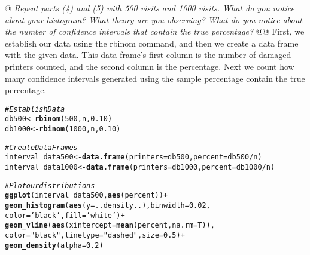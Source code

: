 \documentclass[10pt]{report}\usepackage[]{graphicx}\usepackage[]{xcolor}
\makeatletter
\newcommand{\hlnum}[1]{\textcolor[rgb]{0.686,0.059,0.569}{#1}}%
\newcommand{\hlstr}[1]{\textcolor[rgb]{0.192,0.494,0.8}{#1}}%
\newcommand{\hlcom}[1]{\textcolor[rgb]{0.678,0.584,0.686}{\textit{#1}}}%
\newcommand{\hlopt}[1]{\textcolor[rgb]{0,0,0}{#1}}%
\newcommand{\hlstd}[1]{\textcolor[rgb]{0.345,0.345,0.345}{#1}}%
\newcommand{\hlkwb}[1]{\textcolor[rgb]{0.69,0.353,0.396}{#1}}%
\newcommand{\hlkwc}[1]{\textcolor[rgb]{0.333,0.667,0.333}{#1}}%
\newcommand{\hlkwd}[1]{\textcolor[rgb]{0.737,0.353,0.396}{\textbf{#1}}}%
\newenvironment{kframe}{%
 \def\at@end@of@kframe{}%
 \ifinner\ifhmode%
  \def\at@end@of@kframe{\end{minipage}}%
  \begin{minipage}{\columnwidth}%
 \fi\fi%
 \def\FrameCommand##1{\hskip\@totalleftmargin \hskip-\fboxsep
 \colorbox{shadecolor}{##1}\hskip-\fboxsep
     \hskip-\linewidth \hskip-\@totalleftmargin \hskip\columnwidth}%
 \MakeFramed {\advance\hsize-\width
   \@totalleftmargin\z@ \linewidth\hsize
   \@setminipage}}%
 {\par\unskip\endMakeFramed%
 \at@end@of@kframe}
\newenvironment{knitrout}{}{} %
\makeatother
\begin{document}
\begin{easylist}[enumerate]
        \newpage
        @ \textit{Repeat parts (4) and (5) with 500 visits and 1000 visits. What do you notice about your histogram?
        What theory are you observing? What do you notice about the number of confidence intervals that contain the true
        percentage?}
        @@ First, we establish our data using the {\ttfamily rbinom} command, and then we create a data frame with the
        given data. This data frame's first column is the number of damaged printers counted, and the second column is
        the percentage. Next we count how many confidence intervals generated using the sample percentage contain the
        true percentage.

\begin{knitrout}
\color{fgcolor}\begin{kframe}
\begin{alltt}
         \hlcom{# Establish Data}
         \hlstd{db500} \hlkwb{<-} \hlkwd{rbinom}\hlstd{(}\hlnum{500}\hlstd{, n,} \hlnum{0.10}\hlstd{)}
         \hlstd{db1000} \hlkwb{<-} \hlkwd{rbinom}\hlstd{(}\hlnum{1000}\hlstd{, n,} \hlnum{0.10}\hlstd{)}

         \hlcom{# Create Data Frames}
         \hlstd{interval_data500} \hlkwb{<-} \hlkwd{data.frame}\hlstd{(}\hlkwc{printers}\hlstd{=db500,} \hlkwc{percent}\hlstd{=db500}\hlopt{/}\hlstd{n)}
         \hlstd{interval_data1000} \hlkwb{<-} \hlkwd{data.frame}\hlstd{(}\hlkwc{printers}\hlstd{=db1000,} \hlkwc{percent}\hlstd{=db1000}\hlopt{/}\hlstd{n)}

         \hlcom{# Plot our distributions}
         \hlkwd{ggplot}\hlstd{(interval_data500,} \hlkwd{aes}\hlstd{(percent))} \hlopt{+}
                    \hlkwd{geom_histogram}\hlstd{(}\hlkwd{aes}\hlstd{(}\hlkwc{y}\hlstd{=..density..),} \hlkwc{binwidth}\hlstd{=}\hlnum{0.02}\hlstd{,}
                                   \hlkwc{color}\hlstd{=}\hlstr{'black'}\hlstd{,} \hlkwc{fill}\hlstd{=}\hlstr{'white'}\hlstd{)} \hlopt{+}
                    \hlkwd{geom_vline}\hlstd{(}\hlkwd{aes}\hlstd{(}\hlkwc{xintercept}\hlstd{=}\hlkwd{mean}\hlstd{(percent,} \hlkwc{na.rm}\hlstd{=T)),}
                               \hlkwc{color}\hlstd{=}\hlstr{"black"}\hlstd{,} \hlkwc{linetype}\hlstd{=}\hlstr{"dashed"}\hlstd{,} \hlkwc{size}\hlstd{=}\hlnum{0.5}\hlstd{)} \hlopt{+}
                    \hlkwd{geom_density}\hlstd{(}\hlkwc{alpha}\hlstd{=}\hlnum{0.2}\hlstd{)}


\end{alltt}
\end{kframe}
\end{knitrout}
\end{easylist}
\end{document}
